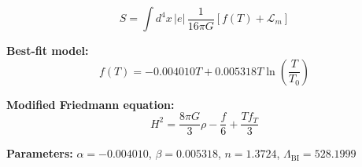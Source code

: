 
\begin{equation}
  S = \int d^4x \, |e| \, \frac{1}{16\pi G} \left[ f(T) + \mathcal{L}_m \right]
\end{equation}

\textbf{Best-fit model:}
\begin{equation}
  f(T) = -0.004010 T + 0.005318 T \ln\!\left(\frac{T}{T_0}\right)
\end{equation}

\textbf{Modified Friedmann equation:}
\begin{equation}
  H^2 = \frac{8\pi G}{3} \rho - \frac{f}{6} + \frac{T f_T}{3}
\end{equation}

\textbf{Parameters:}
$\alpha = -0.004010$, \quad
$\beta = 0.005318$, \quad
$n = 1.3724$, \quad
$\Lambda_{\text{BI}} = 528.1999$